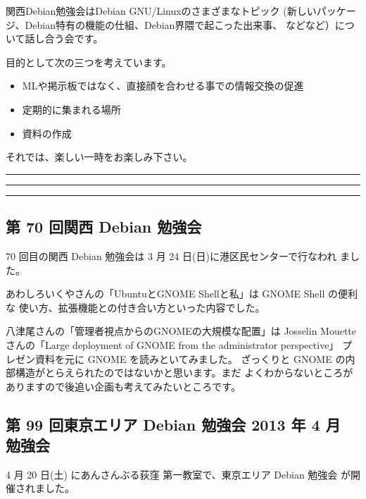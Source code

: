 \documentclass[mingoth,a4paper]{jsarticle}
\begin{document}
 関西Debian勉強会はDebian GNU/Linuxのさまざまなトピック
 (新しいパッケージ、Debian特有の機能の仕組、Debian界隈で起こった出来事、
 などなど）について話し合う会です。

 目的として次の三つを考えています。
 \begin{itemize}
  \item MLや掲示板ではなく、直接顔を合わせる事での情報交換の促進
  \item 定期的に集まれる場所
  \item 資料の作成
 \end{itemize}

 それでは、楽しい一時をお楽しみ下さい。

\newpage

\begin{minipage}[b]{0.2\hsize}
 {}
\end{minipage}
\begin{minipage}[b]{0.8\hsize}
\hrule
\vspace{2mm}
\hrule
\setcounter{tocdepth}{1}
\tableofcontents
\vspace{2mm}
\hrule
\end{minipage}


\subsection{第 70 回関西 Debian 勉強会}

70 回目の関西 Debian 勉強会は 3 月 24 日(日)に港区民センターで行なわれ
ました。

あわしろいくやさんの「UbuntuとGNOME Shellと私」は GNOME Shell の便利な
使い方、拡張機能との付き合い方といった内容でした。

八津尾さんの「管理者視点からのGNOMEの大規模な配置」は Josselin Mouette
さんの「Large deployment of GNOME from the administrator perspective」
プレゼン資料を元に GNOME を読みといてみました。
ざっくりと GNOME の内部構造がとらえられたのではないかと思います。まだ
よくわからないところがありますので後追い企画も考えてみたいところです。

\subsection{第 99 回東京エリア Debian 勉強会 2013 年 4 月 勉強会}
4 月 20 日(土) にあんさんぶる荻窪 第一教室で、東京エリア Debian 勉強会
が開催されました。
\end{document}
